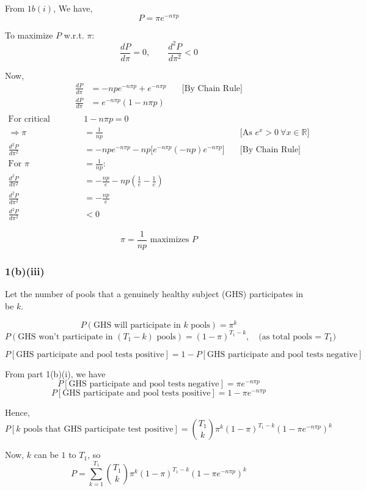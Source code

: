 \documentclass[12pt]{article}
\begin{document}
From $1b(i)$, We have,
\[
P = \pi e^{-n\pi p}
\]

To maximize \( P \) w.r.t. \( \pi \):
\[
\frac{dP}{d\pi} = 0, \qquad \frac{d^2P}{d\pi^2} < 0
\]

Now,
\begin{align*}
\frac{dP}{d\pi} &= -n p e^{-n\pi p} + e^{-n\pi p} \quad &\text{[By Chain Rule]} \\
\frac{dP}{d\pi} &= e^{-n\pi p} (1 - n\pi p) \\[6pt]
\end{align*}
\begin{align*}
    \text{For critical points: } & 1 - n\pi p = 0 \\
\Rightarrow \pi &= \frac{1}{np} \quad &\text{[As $e^x > 0 \ \forall x \in \mathbb{R}$]} \\[10pt]
\frac{d^2P}{d\pi^2} &= -np e^{-n\pi p} - np \Big[e^{-n\pi p}(-np) e^{-n\pi p}\Big] \quad &\text{[By Chain Rule]} \\[8pt]
\text{For } \pi &= \frac{1}{np}: \\
\frac{d^2P}{d\pi^2} &= -\frac{np}{e} - np \left(\frac{1}{e} - \frac{1}{e}\right) \\
\frac{d^2P}{d\pi^2} &= -\frac{np}{e} \\
\frac{d^2P}{d\pi^2} &< 0
\end{align*}

\[
\boxed{\pi = \frac{1}{np} \text{ maximizes } P}
\]
\subsubsection{1(b)(iii)}
Let the number of pools that a genuinely healthy subject (GHS) participates in be $k$.

\[
P(\text{GHS will participate in $k$ pools}) = \pi^k
\]
\[
P(\text{GHS won't participate in $(T_1-k)$ pools}) = (1-\pi)^{T_1-k}, 
\quad \text{(as total pools = $T_1$)}
\]

\[
P[\text{GHS participate and pool tests positive}] 
= 1 - P[\text{GHS participate and pool tests negative}]
\]

From part 1(b)(i), we have
\[
P[\text{GHS participate and pool tests negative}] = \pi e^{-n\pi p}
\]
\[
P[\text{GHS participate and pool tests positive}] 
= 1 - \pi e^{-n\pi p}
\]

Hence,
\[
P[\text{$k$ pools that GHS participate test positive}] 
= \binom{T_1}{k} \pi^k (1-\pi)^{T_1-k} 
\left(1 - \pi e^{-n\pi p}\right)^k
\]

Now, $k$ can be $1$ to $T_1$, so
\[
P = \sum_{k=1}^{T_1} \binom{T_1}{k} \pi^k (1-\pi)^{T_1-k} 
\left(1 - \pi e^{-n\pi p}\right)^k
\]
\end{document}

